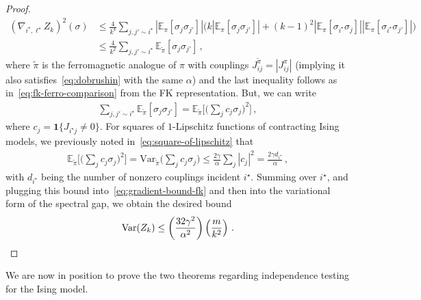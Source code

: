 \documentclass[reqno,11pt]{amsart}
\numberwithin{equation}{section}
\theoremstyle{definition}{
\newtheorem{example}[theorem]{Example}
\newtheorem{definition}[theorem]{Definition}
\newtheorem*{definition*}{Definition}
\newtheorem{problem}[theorem]{Problem}
\newtheorem{question}[theorem]{Question}
\newtheorem{remark}[theorem]{Remark}
}
\begin{document}
\begin{proof}
\begin{align}\label{eq:gradient-bound-fk}
(\nabla_{i^\star,\ell^\star} Z_k)^2 (\sigma) & \leq \frac 4{k^4} \sum_{j,j' \sim i^{\star}} |\mathbb E_{\pi} [\sigma_j \sigma_{j'}]| \bigg(k |\mathbb E_{\pi}[\sigma_j \sigma_{j'}]|+{(k-1)^2}|\mathbb E_{\pi}[\sigma_{i^\star}\sigma_j]||\mathbb E_{\pi} [\sigma_{i^\star} \sigma_{j'}]| \bigg) \nonumber \\ 
& \leq \frac {4}{k^2} \sum_{j,j' \sim i^{\star}}  {\mathbb E}_{\tilde \pi} [\sigma_j \sigma_{j'}]\,,
\end{align}
where $\tilde \pi$ is the ferromagnetic analogue of $\pi$ with couplings $J_{ij}^{\tilde \pi} = |J_{ij}^\pi|$ (implying it also satisfies~\eqref{eq:dobrushin} with the same $\alpha$) and the last inequality follows as in~\eqref{eq:fk-ferro-comparison} from the FK representation. But, we can write 
\begin{align*}
\sum_{j,j'\sim i^{\star}} \mathbb E_{\tilde \pi} [\sigma_j \sigma_{j'}] = \mathbb E_{\tilde \pi} \bigg[\Big(\sum_{j} c_j \sigma_j\Big)^2\bigg]\,,
\end{align*}
where $c_j = \boldsymbol 1\{J_{i^\star j} \neq 0\}$. For squares of $1$-Lipschitz functions of contracting Ising models, we previously noted in~\eqref{eq:square-of-lipschitz} that  
\begin{align*}
 \mathbb E_{\tilde \pi} \bigg[\Big(\sum_j c_j \sigma_j\Big)^2\bigg]= \mathrm{Var}_{\tilde \pi} \Big(\sum_{j} c_j \sigma_j\Big)  \leq \frac{2\gamma}{\alpha} \sum_j |c_j|^2 = \frac{2\gamma d_{i^{\star}}}\alpha\,,
\end{align*}
with $d_{i^\star}$ being the number of nonzero couplings incident $i^{\star}$.
Summing over $i^{\star}$, and plugging this bound into~\eqref{eq:gradient-bound-fk} and then into the variational form of the spectral gap, we obtain the desired bound
\begin{equation*}
\mathrm{Var}(Z_k) \leq \left(\frac {32\gamma^2}{\alpha^2}\right)\left(\frac {m}{k^2}\right)\,. \qedhere
\end{equation*}
\end{proof}

We are now in position to prove the two theorems regarding independence testing for the Ising model. 
\end{document}
